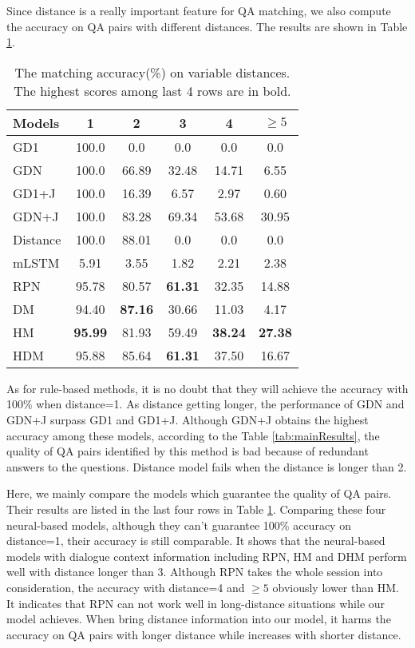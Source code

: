  Since distance is a really important feature for QA matching, we also compute the accuracy on QA pairs with different distances. The results are shown in Table \ref{tab:longrangeResults}.

\begin{table}[h]
	\small
	\centering
	\begin{tabular}{p{1.5cm}<{\centering}ccccc}
		\toprule[1.3pt]
		 Models &1&2&3&4&$\geq5$\\
		\midrule[1pt]
		GD1     &100.0&0.0&0.0&0.0&0.0\\
		GDN     &100.0&66.89&32.48&14.71&6.55\\
		GD1+J&100.0&16.39&6.57&2.97&0.60\\
		GDN+J&100.0&83.28&69.34&53.68&30.95\\
		\hline
		Distance      &100.0&88.01&0.0&0.0&0.0 \\
		mLSTM   &5.91&3.55&1.82&2.21&2.38\\
		RPN  &95.78&80.57&\textbf{61.31}&32.35&14.88\\
		\hline		
		DM &94.40&\textbf{87.16}&30.66&11.03&4.17\\
		HM &\textbf{95.99}&81.93&59.49&\textbf{38.24}&\textbf{27.38}\\
		HDM &95.88&85.64&\textbf{61.31}&37.50&16.67\\
		\bottomrule[1.3pt]
	\end{tabular}
	\caption{The matching accuracy(\%) on variable distances. The highest scores among last 4 rows are in bold.}
	\label{tab:longrangeResults}
\end{table}

As for rule-based methods, it is no doubt that they will achieve the accuracy with 100\% when distance=1. As distance getting longer, the performance of GDN and GDN+J surpass GD1 and GD1+J. Although GDN+J obtains the highest accuracy among these models, according to the Table \ref{tab:mainResults}, the quality of QA pairs identified by this method is bad because of redundant answers to the questions. Distance model fails when the distance is longer than 2. 


Here, we mainly compare the models which guarantee the quality of QA pairs. Their results are listed in the last four rows in Table \ref{tab:longrangeResults}. Comparing these four neural-based models, although they can't guarantee 100\% accuracy on distance=1, their accuracy is still comparable. It shows that the neural-based models with dialogue context information including RPN, HM and DHM perform well with distance longer than 3. Although RPN takes the whole session into consideration, the accuracy with distance=4 and $\geq5$ obviously lower than HM. It indicates that RPN can not work well in long-distance situations while our model achieves. When bring distance information into our model, it harms the accuracy on QA pairs with longer distance while increases with shorter distance. 





